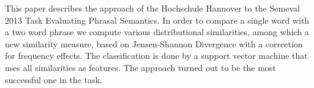 This paper describes the approach of the Hochschule Hannover to the Semeval 2013 Task Evaluating Phrasal Semantics. In order to compare a single word with
 a two word phrase we compute various distributional similarities, among which a
 new similarity measure, based on Jensen-Shannon Divergence with a correction
 for frequency effects. The classification is done by a support vector machine
 that uses all similarities as features. The approach turned out to be the most
 successful one in the task.

